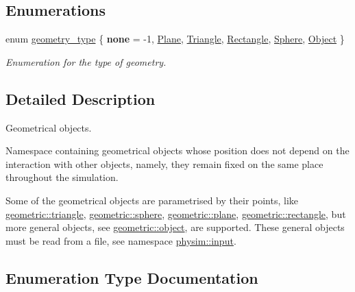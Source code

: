 \subsection*{Enumerations}
\begin{DoxyCompactItemize}
\item 
enum \hyperlink{namespacephysim_1_1geometric_ac2794fff270c5b2ff4307f107a365fca}{geometry\+\_\+type} \{ \newline
{\bfseries none} = -\/1, 
\hyperlink{namespacephysim_1_1geometric_ac2794fff270c5b2ff4307f107a365fcaada2ae991b7062eaee11973f3c1926678}{Plane}, 
\hyperlink{namespacephysim_1_1geometric_ac2794fff270c5b2ff4307f107a365fcaadcf071a7b88867762e81730452f4b284}{Triangle}, 
\hyperlink{namespacephysim_1_1geometric_ac2794fff270c5b2ff4307f107a365fcaaec1691b01dfeb4d2115d1789d3350c30}{Rectangle}, 
\newline
\hyperlink{namespacephysim_1_1geometric_ac2794fff270c5b2ff4307f107a365fcaadea58f36128f5a4be0fe79472395ad58}{Sphere}, 
\hyperlink{namespacephysim_1_1geometric_ac2794fff270c5b2ff4307f107a365fcaa2b5aa0783c878e1a658e297335a75f9a}{Object}
 \}\begin{DoxyCompactList}\small\item\em Enumeration for the type of geometry. \end{DoxyCompactList}
\end{DoxyCompactItemize}


\subsection{Detailed Description}
Geometrical objects. 

Namespace containing geometrical objects whose position does not depend on the interaction with other objects, namely, they remain fixed on the same place throughout the simulation.

Some of the geometrical objects are parametrised by their points, like \hyperlink{classphysim_1_1geometric_1_1triangle}{geometric\+::triangle}, \hyperlink{classphysim_1_1geometric_1_1sphere}{geometric\+::sphere}, \hyperlink{classphysim_1_1geometric_1_1plane}{geometric\+::plane}, \hyperlink{classphysim_1_1geometric_1_1rectangle}{geometric\+::rectangle}, but more general objects, see \hyperlink{classphysim_1_1geometric_1_1object}{geometric\+::object}, are supported. These general objects must be read from a file, see namespace \hyperlink{namespacephysim_1_1input}{physim\+::input}. 

\subsection{Enumeration Type Documentation}
\mbox{\label{namespacephysim_1_1geometric_ac2794fff270c5b2ff4307f107a365fca}} 

